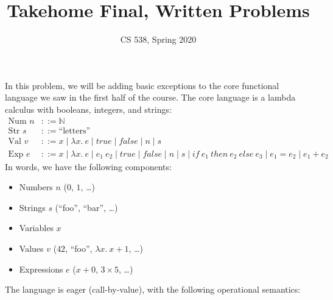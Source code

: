 \documentclass{article}
\title{Takehome Final, Written Problems}
\author{CS 538, Spring 2020}
\begin{document}
\maketitle

\newcommand*{\Tr}{\mathit{true}}
\newcommand*{\Fa}{\mathit{false}}

In this problem, we will be adding basic exceptions to the core functional
language we saw in the first half of the course. The core language is a lambda
calculus with booleans, integers, and strings:
%
\begin{align*}
  \text{Num } n &::= \mathbb{N}
  \\
  \text{Str } s &::= \text{``letters''}
  \\
  \text{Val } v &::= x
    \mid \lambda x.~e
    \mid \Tr
    \mid \Fa
    \mid n
    \mid s
  \\
  \text{Exp } e &::= x
    \mid \lambda x.~e
    \mid e_1~e_2
    \mid \Tr
    \mid \Fa
    \mid n
    \mid s
    \mid \mathit{if}~e_1~\mathit{then}~e_2~\mathit{else}~e_3
    \mid e_1 = e_2
    \mid e_1 + e_2
\end{align*}
%
In words, we have the following components:
%
\begin{itemize}
  \item Numbers $n$ ($0$, $1$, \dots)
  \item Strings $s$ (``foo'', ``bar'', \dots)
  \item Variables $x$
  \item Values $v$ ($42$, ``foo'', $\lambda x.~x + 1$, \dots)
  \item Expressions $e$ ($x + 0$, $3 \times 5$, \dots)
\end{itemize}
%
The language is eager (call-by-value), with the following operational semantics:
%
\end{document}

